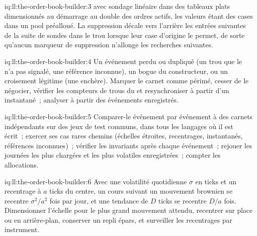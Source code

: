\begin{solution}{iq:ll:the-order-book-builder:3}
 avec sondage linéaire dans des tableaux plats dimensionnés au démarrage au double des ordres actifs, les valeurs étant des cases dans un
pool préalloué. La suppression décale vers l'arrière les entrées suivantes de la suite de sondes dans le trou lorsque leur case d'origine le permet,
de sorte qu'aucun marqueur de suppression n'allonge les recherches suivantes.
\end{solution}

\begin{solution}{iq:ll:the-order-book-builder:4}
Un événement perdu ou dupliqué (un trou que le  n'a pas signalé, une référence inconnue), un bogue du constructeur, ou un croisement légitime
(une enchère). Marquer le carnet comme périmé, cesser de le négocier, vérifier les compteurs de trous du  et resynchroniser à partir d'un instantané~;
analyser à partir des événements enregistrés.
\end{solution}

\begin{solution}{iq:ll:the-order-book-builder:5}
Comparer-le événement par événement à des carnets indépendants sur des jeux de test communs, dans tous les langages où il est écrit~; exercer ses cas rares
chemins (échelles étroites, recentrages, instantanés, références inconnues)~; vérifier les invariants après chaque événement~; rejouer les journées les plus chargées et
les plus volatiles enregistrées~; compter les allocations.
\end{solution}

\begin{solution}{iq:ll:the-order-book-builder:6}
Avec une volatilité quotidienne $\sigma$ en ticks et un recentrage à $a$ ticks du centre, un cours suivant un mouvement brownien se recentre $\sigma^2/a^2$
fois par jour, et une tendance de $D$ ticks se recentre $D/a$ fois. Dimensionner l'échelle pour le plus grand mouvement attendu, recentrer sur place ou
en arrière-plan, conserver un repli épars, et surveiller les recentrages par instrument.
\end{solution}
